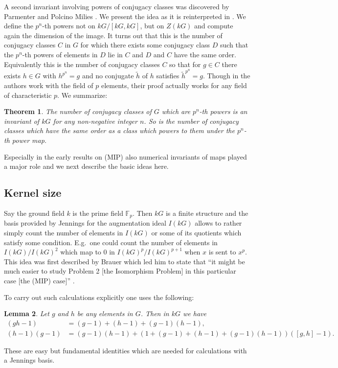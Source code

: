 \documentclass[11pt, a4paper]{amsart}
\newtheorem{theorem}{Theorem}[section]
\newtheorem{lemma}[theorem]{Lemma}
\theoremstyle{definition}
\begin{document}
A second invariant involving powers of conjugacy classes was discovered by Parmenter and Polcino Milies \cite{ParmenterPolcinoMilies81}. We present the idea as it is reinterpreted in \cite{HertweckSoriano06}. We define the $p^n$-th powers not on $kG/[kG,kG]$, but on $Z(kG)$ and compute again the dimension of the image. It turns out that this is the number of conjugacy classes $C$ in $G$ for which there exists some conjugacy class $D$ such that the $p^n$-th powers of elements in $D$ lie in $C$ and $D$ and $C$ have the same order. Equivalently this is the number of conjugacy classes $C$ so that for $g \in C$ there exists $h \in G$ with $h^{p^n} = g$ and no conjugate $\tilde{h}$ of $h$ satisfies $\tilde{h}^{p^n} = g$. Though in \cite{ParmenterPolcinoMilies81} the authors work with the field of $p$ elements, their proof actually works for any field of characteristic $p$. We summarize:

\begin{theorem}\cite{Kuelshammer82, ParmenterPolcinoMilies81}
The number of conjugacy classes of $G$ which are $p^n$-th powers is an invariant of $kG$ for any non-negative integer $n$. So is the number of conjugacy classes which have the same order as a class which powers to them under the $p^n$-th power map.
\end{theorem}

Especially in the early results on (MIP) also numerical invariants of maps played a major role and we next describe the basic ideas here.

\subsection{Kernel size}
Say the ground field $k$ is the prime field $\mathbb{F}_p$. Then $kG$ is a finite structure and the basis provided by Jennings for the augmentation ideal $I(kG)$ allows to rather simply count the number of elements in $I(kG)$ or some of its quotients which satisfy some condition. E.g.\ one could count the number of elements in $I(kG)/I(kG)^2$ which map to $0$ in $I(kG)^p/I(kG)^{p+1}$ when $x$ is sent to $x^p$. This idea was first described by Brauer which led him to state that ``it might be much easier to study Problem 2 [the Isomorphism Problem] in this particular case [the (MIP) case]'' \cite{Brauer63}. 

To carry out such calculations explicitly one uses the following:
\begin{lemma}\label{lem:BasicIds}
Let $g$ and $h$ be any elements in $G$. Then in $kG$ we have
\begin{align*}\label{eq:BasicFormulas}
(gh-1) &= (g-1) + (h-1) + (g-1)(h-1), \\
(h-1)(g-1) &= (g-1)(h-1) + (1 + (g-1) + (h-1) + (g-1)(h-1))([g,h]-1).
\end{align*}
\end{lemma}
These are easy but fundamental identities which are needed for calculations with a Jennings basis.
\end{document}
